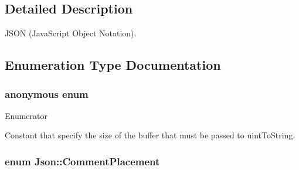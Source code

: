 \subsection{Detailed Description}
J\+S\+O\+N (Java\+Script Object Notation). 

\subsection{Enumeration Type Documentation}
\hypertarget{namespace_json_a0c5f614b019f20b4598dcaec09d9e820}{\subsubsection[{anonymous enum}]{\setlength{\rightskip}{0pt plus 5cm}anonymous enum}}\label{namespace_json_a0c5f614b019f20b4598dcaec09d9e820}
\begin{Desc}
\item[Enumerator]\par
\begin{description}
\item[{\em 
\hypertarget{namespace_json_a0c5f614b019f20b4598dcaec09d9e820ae4f2008c7919f20d81286121d1374424}{uint\+To\+String\+Buffer\+Size}\label{namespace_json_a0c5f614b019f20b4598dcaec09d9e820ae4f2008c7919f20d81286121d1374424}
}]Constant that specify the size of the buffer that must be passed to uint\+To\+String. \end{description}
\end{Desc}
\hypertarget{namespace_json_a4fc417c23905b2ae9e2c47d197a45351}{
\subsubsection[{Comment\+Placement}]{\setlength{\rightskip}{0pt plus 5cm}enum {\bf Json\+::\+Comment\+Placement}}}\label{namespace_json_a4fc417c23905b2ae9e2c47d197a45351}
